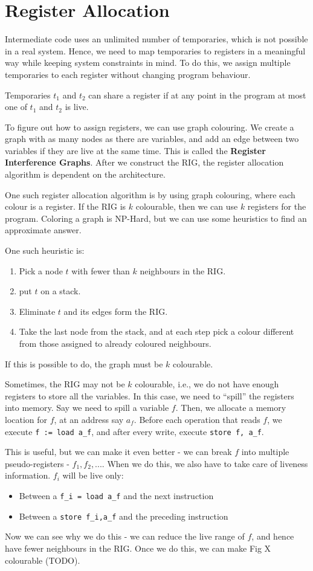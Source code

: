 \documentclass[12pt,letterpaper]{book}
\theoremstyle{definition}
\begin{document}
\section{Register Allocation}

Intermediate code uses an unlimited number of temporaries, which is not possible in a real system. Hence, we need to map temporaries to registers in a meaningful way while keeping system constraints in mind. To do this, we assign multiple temporaries to each register without changing program behaviour.

Temporaries $t_1$ and $t_2$ can share a register if at any point in the program at most one of $t_1$ and $t_2$ is live.

To figure out how to assign registers, we can use graph colouring. We create a graph with as many nodes as there are variables, and add an edge between two variables if they are live at the same time. This is called the \textbf{Register Interference Graphs}. After we construct the RIG, the register allocation algorithm is dependent on the architecture.

One such register allocation algorithm is by using graph colouring, where each colour is a register. If the RIG is $k$ colourable, then we can use $k$ registers for the program. Coloring a graph is NP-Hard, but we can use some heuristics to find an approximate answer.

One such heuristic is:
\begin{enumerate}
  \item Pick a node $t$ with fewer than $k$ neighbours in the RIG.
  \item put $t$ on a stack.
  \item Eliminate $t$ and its edges form the RIG.
  \item Take the last node from the stack, and at each step pick a colour different from those assigned to already coloured neighbours.
\end{enumerate}
If this is possible to do, the graph must be $k$ colourable.

Sometimes, the RIG may not be $k$ colourable, i.e., we do not have enough registers to store all the variables. In this case, we need to ``spill'' the registers into memory. Say we need to spill a variable $f$. Then, we allocate a memory location for $f$, at an address say $a_f$. Before each operation that reads $f$, we execute \texttt{f := load a\_f}, and after every write, execute \texttt{store f, a\_f}.

This is useful, but we can make it even better - we can break $f$ into multiple pseudo-registers - $f_1,f_2,...$. When we do this, we also have to take care of liveness information. $f_i$ will be live only:
\begin{itemize}
  \item Between a \texttt{f\_i = load a\_f} and the next instruction
  \item Between a \texttt{store f\_i,a\_f} and the preceding instruction
\end{itemize}
Now we can see why we do this - we can reduce the live range of $f$, and hence have fewer neighbours in the RIG. Once we do this, we can make Fig X colourable (TODO).
\end{document}
